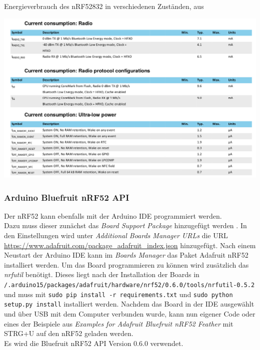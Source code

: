 \begin{table}[h]
  \centering
  \caption{Energieverbrauch des nRF52832 in verschiedenen Zuständen, aus \cite{nordic2017nrf}}
	\includegraphics[width=\textwidth]{images/nrf52consumption.png}
  \label{table:nrf52consumption}
\end{table}


\subsubsection{Arduino Bluefruit nRF52 API}
Der nRF52 kann ebenfalls mit der Arduino IDE programmiert werden.\\
Dazu muss dieser zunächst das \emph{Board Support Package} hinzugefügt werden \cite{townsend2017nrf}.
In den Einstellungen wird unter \textit{Additional Boards Manager URLs} die URL \url{https://www.adafruit.com/package_adafruit_index.json} hinzugefügt.
Nach einem Neustart der Arduino IDE kann im \textit{Boards Manager} das Paket Adafruit nRF52 installiert werden.
Um das Board programmieren zu können wird zusätzlich das \textit{nrfutil} benötigt.
Dieses liegt nach der Installation der Boards in \\\texttt{/.arduino15/packages/adafruit/hardware/nrf52/0.6.0/tools/nrfutil-0.5.2} und muss mit \texttt{sudo pip install -r requirements.txt} und \texttt{sudo python setup.py install} installiert werden.
Nachdem das Board in der IDE ausgewählt und über USB mit dem Computer verbunden wurde, kann nun eigener Code oder eines der Beispiele aus \textit{Examples for Adafruit Bluefruit nRF52 Feather} mit STRG+U auf den nRF52 geladen werden.\\
Es wird die Bluefruit nRF52 API Version 0.6.0 verwendet.



